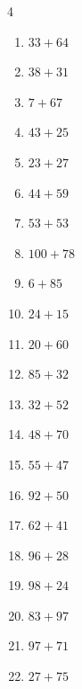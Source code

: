 \begin{multicols}{4}
\begin{enumerate}
  \item $33+64$
        \phantom{$=97$}

  \item $38+31$
        \phantom{$=69$}

  \item $7+67$
        \phantom{$=74$}

  \item $43+25$
        \phantom{$=68$}

  \item $23+27$
        \phantom{$=50$}

  \item $44+59$
        \phantom{$=103$}

  \item $53+53$
        \phantom{$=106$}

  \item $100+78$
        \phantom{$=178$}

  \item $6+85$
        \phantom{$=91$}

  \item $24+15$
        \phantom{$=39$}

  \item $20+60$
        \phantom{$=80$}

  \item $85+32$
        \phantom{$=117$}

  \item $32+52$
        \phantom{$=84$}

  \item $48+70$
        \phantom{$=118$}

  \item $55+47$
        \phantom{$=102$}

  \item $92+50$
        \phantom{$=142$}

  \item $62+41$
        \phantom{$=103$}

  \item $96+28$
        \phantom{$=124$}

  \item $98+24$
        \phantom{$=122$}

  \item $83+97$
        \phantom{$=180$}

  \item $97+71$
        \phantom{$=168$}

  \item $27+75$
        \phantom{$=102$}


\end{enumerate}
\end{multicols}
